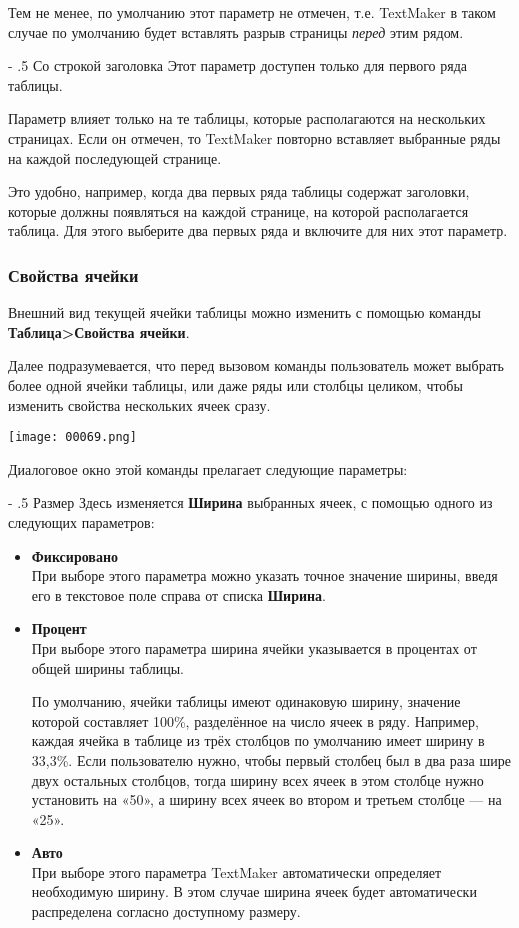 ﻿\documentclass[a4paper,10pt]{article}
\makeatletter
\renewcommand\paragraph{%
   \@startsection{paragraph}{4}{0mm}%
      {-\baselineskip}%
      {.5\baselineskip}%
      {\normalfont\normalsize\bfseries}}
\makeatother
\begin{document}
Тем не менее, по умолчанию этот параметр не отмечен, т.е. TextMaker в таком случае по умолчанию будет вставлять разрыв страницы \textit{перед} этим рядом.

\paragraph{Со строкой заголовка}
Этот параметр доступен только для первого ряда таблицы.

Параметр влияет только на те таблицы, которые располагаются на нескольких страницах. Если он отмечен, то TextMaker повторно вставляет выбранные ряды на каждой последующей странице.

Это удобно, например, когда два первых ряда таблицы содержат заголовки, которые должны появляться на каждой странице, на которой располагается таблица. Для этого выберите два первых ряда и включите для них этот параметр.

\subsubsection{Свойства ячейки} \label{sec:свойстваячейки}
Внешний вид текущей ячейки таблицы можно изменить с помощью команды \textbf{Таблица>Свойства ячейки}.

Далее подразумевается, что перед вызовом команды пользователь может выбрать более одной ячейки таблицы, или даже ряды или столбцы целиком, чтобы изменить свойства нескольких ячеек сразу.

\texttt{[image: 00069.png]}

Диалоговое окно этой команды прелагает следующие параметры:

\paragraph{Размер}
Здесь изменяется \textbf{Ширина} выбранных ячеек, с помощью одного из следующих параметров:
\begin{itemize}
 \item \textbf{Фиксировано}\\
 При выборе этого параметра можно указать точное значение ширины, введя его в текстовое поле справа от списка \textbf{Ширина}.
 \item \textbf{Процент}\\
 При выборе этого параметра ширина ячейки указывается в процентах от общей ширины таблицы.
 
 По умолчанию, ячейки таблицы имеют одинаковую ширину, значение которой составляет 100\%, разделённое на число ячеек в ряду. Например, каждая ячейка в таблице из трёх столбцов по умолчанию имеет ширину в 33,3\%. Если пользователю нужно, чтобы первый столбец был в два раза шире двух остальных столбцов, тогда ширину всех ячеек в этом столбце нужно установить на «50», а ширину всех ячеек во втором и третьем столбце — на «25».
 \item \textbf{Авто}\\
 При выборе этого параметра TextMaker автоматически определяет необходимую ширину. В этом случае ширина ячеек будет автоматически распределена согласно доступному размеру.
\end{itemize}
\end{document}
